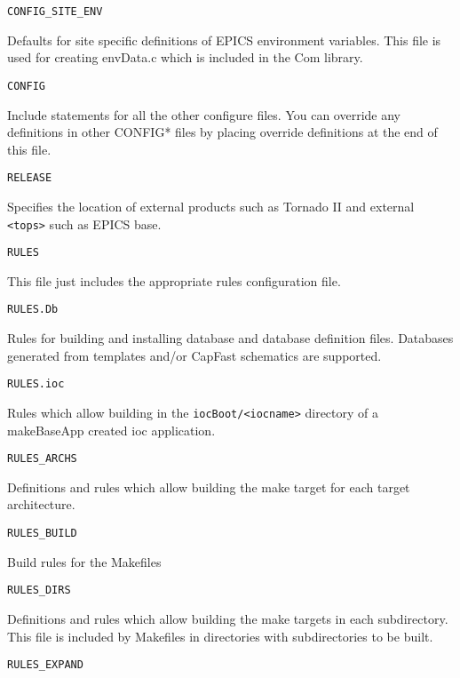 \begin{description}
\item {}\verb|CONFIG_SITE_ENV|

Defaults for site specific definitions of EPICS environment variables. This file is used for creating envData.c 
which is included in the Com library.

\item {}\verb|CONFIG|

Include statements for all the other configure files. You can override any definitions in other CONFIG* files by 
placing override definitions at the end of this file.

\item {}\verb|RELEASE|

Specifies the location of external products such as Tornado II and external \verb|<tops>| such as EPICS base. 

\item {}\verb|RULES|

This file just includes the appropriate rules configuration file.

\item {}\verb|RULES.Db|

Rules for building and installing database and database definition files. Databases generated from templates and/or 
CapFast schematics are supported.

\item {}\verb|RULES.ioc|

Rules which allow building in the \verb|iocBoot/<iocname>| directory of a makeBaseApp created ioc application.

\item {}\verb|RULES_ARCHS|

Definitions and rules which allow building the make target for each target architecture.

\item {}\verb|RULES_BUILD|

Build rules for the Makefiles 

\item {}\verb|RULES_DIRS|

Definitions and rules which allow building the make targets in each subdirectory. This file is included by Makefiles 
in directories with subdirectories to be built.

\item {}\verb|RULES_EXPAND|


\end{description}
